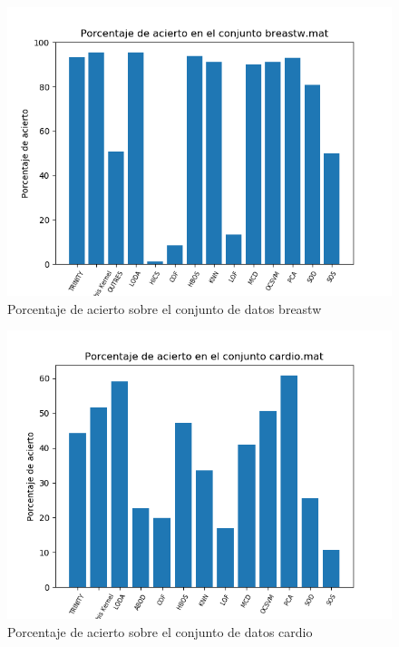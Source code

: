\begin{figure}[H]
	\centering
	\label{breastw_accuracy}
	\includegraphics[scale=0.7]{imagenes/imgs-exp1/accuracy/breastw}
	\caption{Porcentaje de acierto sobre el conjunto de datos breastw}
\end{figure}

\begin{figure}[H]
	\centering
	\label{cardio_accuracy}
	\includegraphics[scale=0.7]{imagenes/imgs-exp1/accuracy/cardio}
	\caption{Porcentaje de acierto sobre el conjunto de datos cardio}
\end{figure}

